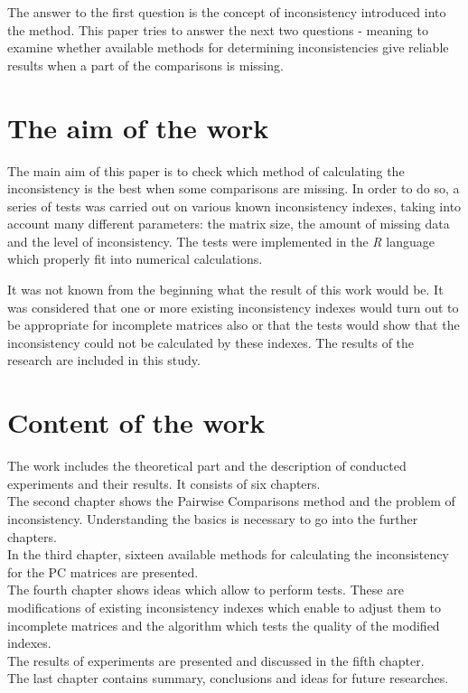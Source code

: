 The answer to the first question is the concept of inconsistency introduced into the method. This paper tries to answer the next two questions - meaning to examine whether available methods for determining inconsistencies give reliable results when a part of the comparisons is missing. 

\section{The aim of the work}
\label{sec:celePracy}
The main aim of this paper is to check which method of calculating the inconsistency is the best when some comparisons are missing. In order to do so, a series of tests was carried out on various known inconsistency indexes, taking into account many different parameters: the matrix size, the amount of missing data and the level of inconsistency.
The tests were implemented in the \textit{R} language which properly fit into numerical calculations.

It was not known from the beginning what the result of this work would be. It was considered that one or more existing inconsistency indexes would turn out to be appropriate for incomplete matrices also or that the tests would show that the inconsistency could not be calculated by these indexes. 
The results of the research are included in this study.

\section{Content of the work}
\label{sec:zawartoscPracy}
The work includes the theoretical part and the description of conducted experiments and their results. It consists of six chapters.\\
The second chapter shows the Pairwise Comparisons method and the problem of inconsistency. Understanding the basics is necessary to go into the further chapters.\\
In the third chapter, sixteen available methods for calculating the inconsistency for the PC matrices are presented. \\
The fourth chapter shows ideas which allow to perform tests. These are modifications of existing inconsistency indexes which enable to adjust them to incomplete matrices and the algorithm which tests the quality of the modified indexes. \\
The results of experiments are presented and discussed in the fifth chapter.\\
The last chapter contains summary, conclusions and ideas for future researches.